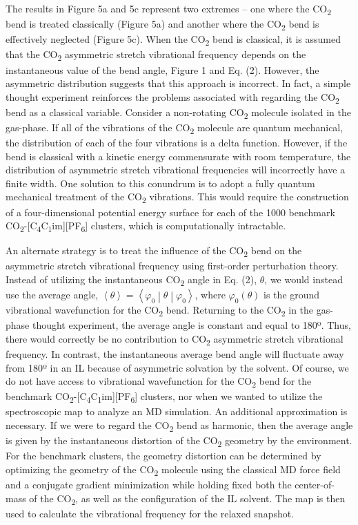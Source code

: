 \documentclass[]{article}
\begin{document}
The results in Figure 5a and 5c represent two extremes -- one where the
CO\textsubscript{2} bend is treated classically (Figure 5a) and another
where the CO\textsubscript{2} bend is effectively neglected (Figure 5c).
When the CO\textsubscript{2} bend is classical, it is assumed that the
CO\textsubscript{2} asymmetric stretch vibrational frequency depends on
the instantaneous value of the bend angle, Figure 1 and Eq. (2).
However, the asymmetric distribution suggests that this approach is
incorrect. In fact, a simple thought experiment reinforces the problems
associated with regarding the CO\textsubscript{2} bend as a classical
variable. Consider a non-rotating CO\textsubscript{2} molecule isolated
in the gas-phase. If all of the vibrations of the CO\textsubscript{2}
molecule are quantum mechanical, the distribution of each of the four
vibrations is a delta function. However, if the bend is classical with a
kinetic energy commensurate with room temperature, the distribution of
asymmetric stretch vibrational frequencies will incorrectly have a
finite width. One solution to this conundrum is to adopt a fully quantum
mechanical treatment of the CO\textsubscript{2} vibrations. This would
require the construction of a four-dimensional potential energy surface
for each of the 1000 benchmark
CO\textsubscript{2}-{[}C\textsubscript{4}C\textsubscript{1}im{]}{[}PF\textsubscript{6}{]}
clusters, which is computationally intractable.

An alternate strategy is to treat the influence of the
CO\textsubscript{2} bend on the asymmetric stretch vibrational frequency
using first-order perturbation theory. Instead of utilizing the
instantaneous CO\textsubscript{2} angle in Eq. (2), \(\theta\), we would
instead use the average angle,
\(\left\langle \theta \right\rangle = \left\langle \varphi_{0} \middle| \theta \middle| \varphi_{0} \right\rangle\),
where \(\varphi_{0}(\theta)\) is the ground vibrational wavefunction for
the CO\textsubscript{2} bend. Returning to the CO\textsubscript{2} in
the gas-phase thought experiment, the average angle is constant and
equal to 180º. Thus, there would correctly be no contribution to
CO\textsubscript{2} asymmetric stretch vibrational frequency. In
contrast, the instantaneous average bend angle will fluctuate away from
180º in an IL because of asymmetric solvation by the solvent. Of course,
we do not have access to vibrational wavefunction for the
CO\textsubscript{2} bend for the benchmark
CO\textsubscript{2}-{[}C\textsubscript{4}C\textsubscript{1}im{]}{[}PF\textsubscript{6}{]}
clusters, nor when we wanted to utilize the spectroscopic map to analyze
an MD simulation. An additional approximation is necessary. If we were
to regard the CO\textsubscript{2} bend as harmonic, then the average
angle is given by the instantaneous distortion of the
CO\textsubscript{2} geometry by the environment. For the benchmark
clusters, the geometry distortion can be determined by optimizing the
geometry of the CO\textsubscript{2} molecule using the classical MD
force field and a conjugate gradient minimization while holding fixed
both the center-of-mass of the CO\textsubscript{2}, as well as the
configuration of the IL solvent. The map is then used to calculate the
vibrational frequency for the relaxed snapshot.
\end{document}
